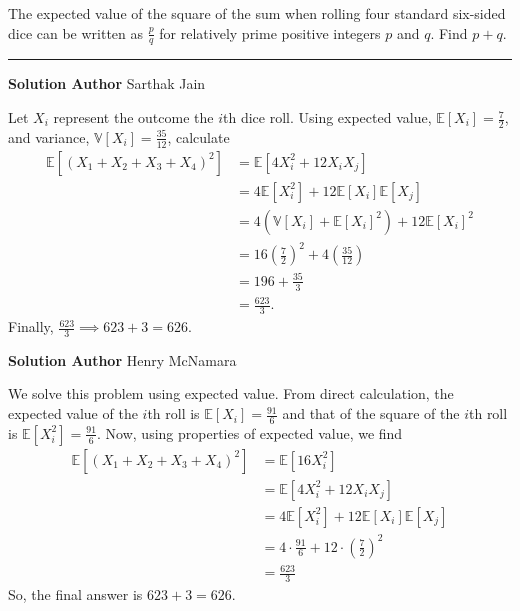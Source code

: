 \documentclass[11pt]{scrartcl}
\newcommand*{\problemfont}{\sffamily\bfseries}
\begin{document}
\pagebreak

\begin{problem}
    The expected value of the square of the sum when rolling four standard six-sided dice can be written as $\frac{p}{q}$ for relatively prime positive integers $p$ and $q$. Find $p + q$.
\end{problem}

\vspace{-\baselineskip}\rule{\textwidth}{0.4pt}

{\problemfont Solution Author} Sarthak Jain

Let $X_i$ represent the outcome the $i$th dice roll. Using expected value, $\mathbb{E}[X_i] = \frac{7}{2}$, and variance, $\mathbb{V}[X_i] = \frac{35}{12}$, calculate
\begin{align*}
    \mathbb{E}[(X_1 + X_2 + X_3 + X_4)^2] &= \mathbb{E}[4X_i^2 + 12X_iX_j] \\ 
    &= 4\mathbb{E}[X_i^2] + 12\mathbb{E}[X_i]\mathbb{E}[X_j] \\
    &= 4 \left(\mathbb{V}[X_i] + \mathbb{E}[X_i]^2 \right) + 12\mathbb{E}[X_i]^2 \\
    &= 16\left(\frac{7}{2}\right)^2 + 4\left(\frac{35}{12}\right) \\
    &= 196 + \frac{35}{3} \\
    &= \frac{623}{3}.
\end{align*}
Finally, $\frac{623}{3} \implies 623 + 3 = \boxed{626}$.

\pagebreak

{\problemfont Solution Author} Henry McNamara

We solve this problem using expected value. From direct calculation, the expected value of the $i$th roll is $\mathbb{E}[X_{i}] = \frac{91}{6}$ and that of the square of the $i$th roll is $\mathbb{E}[X_{i}^{2}] = \frac{91}{6}$. Now, using properties of expected value, we find
\begin{align*}
    \mathbb{E}[(X_{1} + X_{2} + X_{3} + X_{4})^{2}] &= \mathbb{E}[16X_{i}^{2}] \\
    &= \mathbb{E}[4X_{i}^{2} + 12X_{i}X_{j}] \\
    &= 4\mathbb{E}[{X_{i}^{2}}] + 12\mathbb{E}[X_{i}]\mathbb{E}[X_{j}] \\
    &= 4 \cdot \frac{91}{6} + 12 \cdot \left(\frac{7}{2}\right)^{2} \\
    &= \frac{623}{3}
\end{align*}
So, the final answer is $623 + 3 = \boxed{626}$.

\pagebreak
\end{document}
